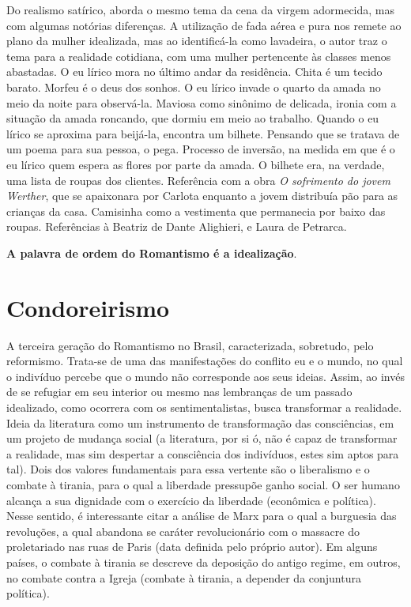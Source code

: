 Do realismo satírico, aborda o mesmo tema da cena da virgem adormecida, mas com algumas notórias diferenças. A utilização de fada aérea e pura nos remete ao plano da mulher idealizada, mas ao identificá-la como lavadeira, o autor traz o tema para a realidade cotidiana, com uma mulher pertencente às classes menos abastadas. O eu lírico mora no último andar da residência. Chita é um tecido barato. Morfeu é o deus dos sonhos. O eu lírico invade o quarto da amada no meio da noite para observá-la. Maviosa como sinônimo de delicada, ironia com a situação da amada roncando, que dormiu em meio ao trabalho. Quando o eu lírico se aproxima para beijá-la, encontra um bilhete. Pensando que se tratava de um poema para sua pessoa, o pega. Processo de inversão, na medida em que é o eu lírico quem espera as flores por parte da amada. O bilhete era, na verdade, uma lista de roupas dos clientes. Referência com a obra \textit{O sofrimento do jovem Werther}, que se apaixonara por Carlota enquanto a jovem distribuía pão para as crianças da casa. Camisinha como a vestimenta que permanecia por baixo das roupas. Referências à Beatriz de Dante Alighieri, e Laura de Petrarca.

\textbf{A palavra de ordem do Romantismo é a idealização}.

\section{Condoreirismo}

A terceira geração do Romantismo no Brasil, caracterizada, sobretudo, pelo reformismo. Trata-se de uma das manifestações do conflito eu e o mundo, no qual o indivíduo percebe que o mundo não corresponde aos seus ideias. Assim, ao invés de se refugiar em seu interior ou mesmo nas lembranças de um passado idealizado, como ocorrera com os sentimentalistas, busca transformar a realidade. Ideia da literatura como um instrumento de transformação das consciências, em um projeto de mudança social (a literatura, por si ó, não é capaz de transformar a realidade, mas sim despertar a consciência dos indivíduos, estes sim aptos para tal). Dois dos valores fundamentais para essa vertente são o liberalismo e o combate à tirania, para o qual a liberdade pressupõe ganho social. O ser humano alcança a sua dignidade com o exercício da liberdade (econômica e política). Nesse sentido, é interessante citar a análise de Marx para o qual a burguesia das revoluções, a qual abandona se caráter revolucionário com o massacre do proletariado nas ruas de Paris (data definida pelo próprio autor). Em alguns países, o combate à tirania se descreve da deposição do antigo regime, em outros, no combate contra a Igreja (combate à tirania, a depender da conjuntura política).

